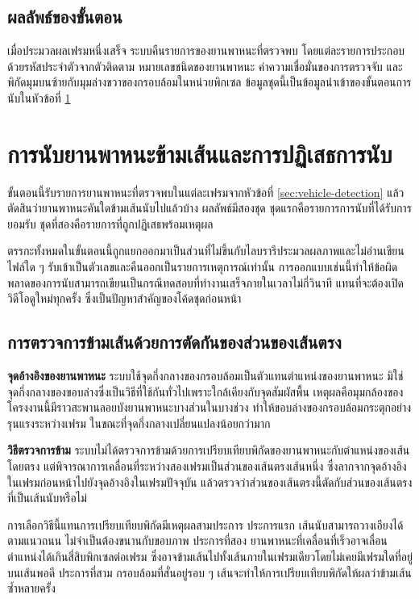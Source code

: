 \subsection{ผลลัพธ์ของขั้นตอน}
\label{subsec:detection-output}

เมื่อประมวลผลเฟรมหนึ่งเสร็จ ระบบคืนรายการของยานพาหนะที่ตรวจพบ โดยแต่ละรายการประกอบด้วยรหัสประจำตัวจากตัวติดตาม หมายเลขชนิดของยานพาหนะ ค่าความเชื่อมั่นของการตรวจจับ และพิกัดมุมบนซ้ายกับมุมล่างขวาของกรอบล้อมในหน่วยพิกเซล ข้อมูลชุดนี้เป็นข้อมูลนำเข้าของขั้นตอนการนับในหัวข้อที่ \ref{sec:counting}

\section{การนับยานพาหนะข้ามเส้นและการปฏิเสธการนับ}
\label{sec:counting}

ขั้นตอนนี้รับรายการยานพาหนะที่ตรวจพบในแต่ละเฟรมจากหัวข้อที่ \ref{sec:vehicle-detection} แล้วตัดสินว่ายานพาหนะคันใดข้ามเส้นนับไปแล้วบ้าง ผลลัพธ์มีสองชุด ชุดแรกคือรายการการนับที่ได้รับการยอมรับ ชุดที่สองคือรายการที่ถูกปฏิเสธพร้อมเหตุผล

ตรรกะทั้งหมดในขั้นตอนนี้ถูกแยกออกมาเป็นส่วนที่ไม่ขึ้นกับไลบรารีประมวลผลภาพและไม่อ่านเขียนไฟล์ใด ๆ รับเข้าเป็นตัวเลขและคืนออกเป็นรายการเหตุการณ์เท่านั้น  การออกแบบเช่นนี้ทำให้ข้อผิดพลาดของการนับสามารถเขียนเป็นกรณีทดสอบที่ทำงานเสร็จภายในเวลาไม่กี่วินาที แทนที่จะต้องเปิดวิดีโอดูใหม่ทุกครั้ง ซึ่งเป็นปัญหาสำคัญของโค้ดชุดก่อนหน้า

\subsection{การตรวจการข้ามเส้นด้วยการตัดกันของส่วนของเส้นตรง}
\label{subsec:line-crossing}

\textbf{จุดอ้างอิงของยานพาหนะ} ระบบใช้จุดกึ่งกลางของกรอบล้อมเป็นตัวแทนตำแหน่งของยานพาหนะ มิใช่จุดกึ่งกลางของขอบล่างซึ่งเป็นวิธีที่ใช้กันทั่วไปเพราะใกล้เคียงกับจุดสัมผัสพื้น  เหตุผลคือมุมกล้องของโครงงานนี้มีราวสะพานลอยบังยานพาหนะบางส่วนในบางช่วง ทำให้ขอบล่างของกรอบล้อมกระตุกอย่างรุนแรงระหว่างเฟรม ในขณะที่จุดกึ่งกลางเปลี่ยนแปลงน้อยกว่ามาก

\textbf{วิธีตรวจการข้าม} ระบบไม่ได้ตรวจการข้ามด้วยการเปรียบเทียบพิกัดของยานพาหนะกับตำแหน่งของเส้นโดยตรง แต่พิจารณาการเคลื่อนที่ระหว่างสองเฟรมเป็นส่วนของเส้นตรงเส้นหนึ่ง ซึ่งลากจากจุดอ้างอิงในเฟรมก่อนหน้าไปยังจุดอ้างอิงในเฟรมปัจจุบัน แล้วตรวจว่าส่วนของเส้นตรงนี้ตัดกับส่วนของเส้นตรงที่เป็นเส้นนับหรือไม่ 

การเลือกวิธีนี้แทนการเปรียบเทียบพิกัดมีเหตุผลสามประการ ประการแรก เส้นนับสามารถวางเอียงได้ตามแนวถนน ไม่จำเป็นต้องขนานกับขอบภาพ ประการที่สอง ยานพาหนะที่เคลื่อนที่เร็วอาจเลื่อนตำแหน่งได้เกินสี่สิบพิกเซลต่อเฟรม ซึ่งอาจข้ามเส้นไปทั้งเส้นภายในเฟรมเดียวโดยไม่เคยมีเฟรมใดที่อยู่บนเส้นพอดี ประการที่สาม กรอบล้อมที่สั่นอยู่รอบ ๆ เส้นจะทำให้การเปรียบเทียบพิกัดให้ผลว่าข้ามเส้นซ้ำหลายครั้ง

